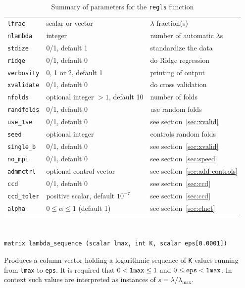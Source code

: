 \documentclass{article}
\newenvironment{funcdoc}
{\noindent\hrulefill\\[-12pt]}
{\medbreak}
\begin{document}
\begin{table}[htbp]
  \centering
  \begin{tabular}{lll}
    \texttt{lfrac} & scalar or vector & $\lambda$-fraction(s) \\
    \texttt{nlambda} & integer & number of automatic $\lambda$s \\
    \texttt{stdize} & 0/1, default 1 & standardize the data \\
    \texttt{ridge} & 0/1, default 0 & do Ridge regression \\
    \texttt{verbosity} & 0, 1 or 2, default 1 & printing of output\\
    \texttt{xvalidate} & 0/1, default 0 & do cross validation\\
    \texttt{nfolds} & optional integer $>1$, default 10 & number of
                                                          folds \\
    \texttt{randfolds} & 0/1, default 0 & use random folds\\
    \texttt{use\_1se} & 0/1, default 0 & see section~\ref{sec:xvalid} \\
    \texttt{seed} & optional integer & controls random folds\\
    \texttt{single\_b} & 0/1, default 0 & see section~\ref{sec:xvalid}\\
    \texttt{no\_mpi} & 0/1, default 0 & see section~\ref{sec:speed}\\
    \texttt{admmctrl} & optional control vector & see
                                                  section~\ref{sec:add-controls} \\
    \texttt{ccd} & 0/1, default 0 & see section~\ref{sec:ccd} \\
    \texttt{ccd\_toler} & positive scalar, default $10^{-7}$ & see
                                                               section~\ref{sec:ccd}\\
    \texttt{alpha} & $0 \leq \alpha \leq 1$ (default 1) & see
                                                               section~\ref{sec:elnet}
  \end{tabular}
  \caption{Summary of parameters for the \texttt{regls} function}
  \label{tab:regls-parms}
\end{table}

\begin{funcdoc}
\begin{verbatim}
matrix lambda_sequence (scalar lmax, int K, scalar eps[0.0001])
\end{verbatim}
  Produces a column vector holding a logarithmic sequence of
  \texttt{K} values running from \texttt{lmax} to \texttt{eps}. It is
  required that $0 < \mbox{\texttt{lmax}} \le 1$ and
  $0 \le \mbox{\texttt{eps}} < \mbox{\texttt{lmax}}$. In context such
  values are interpreted as instances of $s = \lambda/\lambda_{\max}$.
\end{funcdoc}
\end{document}
